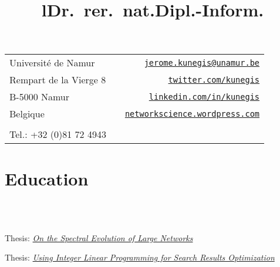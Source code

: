 \documentclass[line,mm]{res}
\newcounter{x}
\begin{document}
\begin{resume}

\vspace{0.5cm}

\hspace{-0.3cm}
\begin{tabular}{lcr}
  Université de Namur    &\hspace{3.5cm}\hfill& {\tt \href{mailto:jerome.kunegis@unamur.be}{jerome.kunegis@unamur.be}} \\
  Rempart de la Vierge 8 &                    & {\tt \href{http://twitter.com/kunegis}{twitter.com/kunegis}} \\
  B-5000 Namur           &                    & {\tt \href{http://www.linkedin.com/in/kunegis}{linkedin.com/in/kunegis}} \\
  Belgique               &                    & {\tt \href{http://networkscience.wordpress.com/}{networkscience.wordpress.com}} \\
  & & \\
  Tel.:  +32 (0)81 72 4943
\end{tabular}
\vspace{0.5cm}

\section{Education}

\begin{format}
\title{l}\\
\\
\end{format}

\title{\bf Dr.\ rer.\ nat.}
\begin{position}
Thesis:
\emph{\href{https://kola.opus.hbz-nrw.de/frontdoor/index/index/docId/581}{On
    the Spectral Evolution of Large Networks}} \hspace{0.2cm} \href{https://www.slideshare.net/kunegis/on-the-spectral-evolution-of-large-networks-phd-thesis-by-jrme-kunegis}{\faSlideshare}  
\end{position}

\title{\bf Dipl.-Inform.}
\begin{position}
Thesis: \emph{\href{https://pdfs.semanticscholar.org/42ca/e9b00864ee09bc9bc92ef3d411e20b966a8d.pdf}{Using Integer Linear Programming for Search Results Optimization}}
\end{position}


\end{resume}
\end{document}
